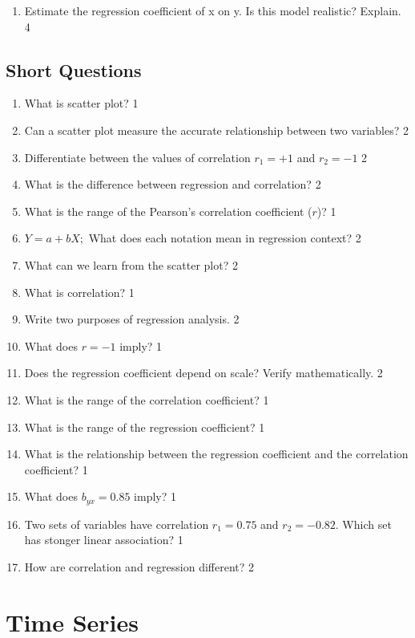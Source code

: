 \documentclass[a4paper,oneside]{book}
\begin{document}
\begin{enumerate}
\begin{enumerate}
\begin{enumerate}
    \item
    Estimate the regression coefficient of x on y. Is this model realistic? Explain. \hfill 4
\end{enumerate}
\end{enumerate}

\section{Short Questions}

  \begin{enumerate}
  \item What is scatter plot? \hfill 1
  \item Can a scatter plot measure the accurate relationship between two variables? \hfill 2
  \item Differentiate between the values of correlation $r_1 = +1$ and $r_2=-1$ \hfill 2
  \item What is the difference between regression and correlation? \hfill 2
  \item What is the range of the Pearson's correlation coefficient ($r$)? \hfill 1
  \item $Y= a +bX;$ What does each notation mean in regression context? \hfill 2
  \item What can we learn from the scatter plot? \hfill 2
  \item What is correlation? \hfill 1
  \item Write two purposes of regression analysis. \hfill 2
  \item What does $r=-1$ imply? \hfill 1
  \item Does the regression coefficient depend on scale? Verify mathematically. \hfill 2
  \item What is the range of the correlation coefficient?  \hfill 1
  \item What is the range of the regression coefficient? \hfill 1
  \item What is the relationship between the regression coefficient and the correlation coefficient? \hfill 1
  \item What does $b_{yx} = 0.85$ imply? \hfill 1
  \item Two sets of variables have correlation $r_1 = 0.75$ and $r_2 = -0.82$. Which set has stonger linear association? \hfill 1
  \item How are correlation and regression different? \hfill 2
  \end{enumerate}

\chapter{Time Series} 

\end{enumerate}
\end{document}

